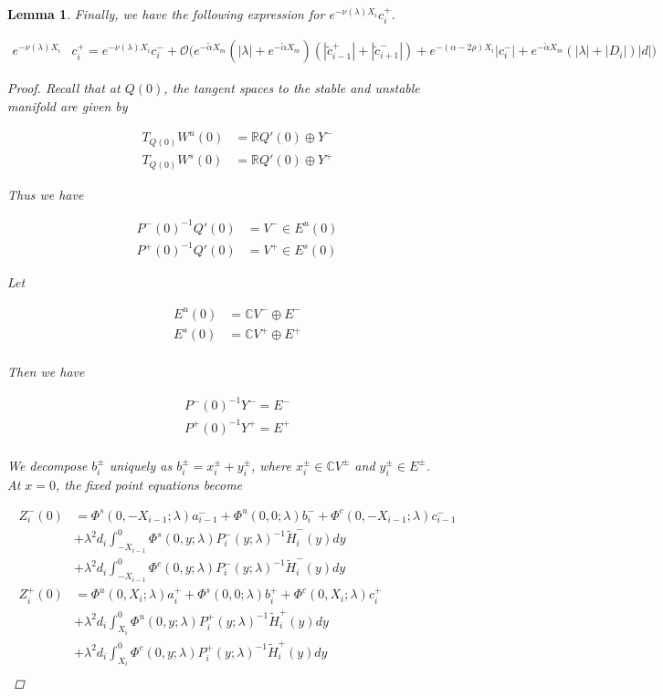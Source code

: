 \documentclass[12pt]{article}
\def\R{{\mathbb R}}
\def\C{{\mathbb C}}
\newtheorem{lemma}{Lemma}
\begin{document}
\begin{lemma}
Finally, we have the following expression for $e^{-\nu(\lambda)X_i} c_i^+$.

\begin{align}\label{tildecminus}
e^{-\nu(\lambda)X_i} &c_i^+ = e^{-\nu(\lambda)X_i} c_i^- 
+ \mathcal{O}\Big( e^{-\tilde{\alpha}X_m} (|\lambda| + e^{-\tilde{\alpha}X_m})( |\tilde{c}_{i-1}^+| + |\tilde{c}_{i+1}^-|) 
+ e^{-(\alpha - 2 \rho)X_i}|c_i^-| +  e^{-\tilde{\alpha}X_m}(|\lambda| + |D_i|)|d| \Big)
\end{align}

\begin{proof}

Recall that at $Q(0)$, the tangent spaces to the stable and unstable manifold are given by

\begin{align*}
T_{Q(0)} W^u(0) &= \R Q'(0) \oplus Y^- \\
T_{Q(0)} W^s(0) &= \R Q'(0) \oplus Y^+
\end{align*}

Thus we have

\begin{align*}
P^-(0)^{-1} Q'(0) &= V^- \in E^u(0) \\
P^+(0)^{-1} Q'(0) &= V^+ \in E^s(0)
\end{align*}

Let

\begin{align*}
E^u(0) &= \C V^- \oplus E^- \\
E^s(0) &= \C V^+ \oplus E^+ \\
\end{align*}

Then we have

\begin{align*}
P^-(0)^{-1} Y^- = E^- \\
P^+(0)^{-1} Y^+ = E^+ \\
\end{align*}

We decompose $b_i^\pm$ uniquely as $b_i^\pm = x_i^\pm + y_i^\pm$, where $x_i^\pm \in \C V^\pm$ and $y_i^\pm \in E^\pm$.\\

At $x = 0$, the fixed point equations become

\begin{align*}
Z_i^-(0) &= \Phi^s(0, -X_{i-1}; \lambda) a_{i-1}^- + \Phi^u(0, 0; \lambda) b_i^- + \Phi^c(0, -X_{i-1}; \lambda) c_{i-1}^- \\
&+ \lambda^2 d_i \int_{-X_{i-1}}^0 \Phi^s(0, y; \lambda) P_i^-(y; \lambda)^{-1} \tilde{H}_i^-(y) dy \\
&+ \lambda^2 d_i \int_{-X_{i-1}}^0 \Phi^c(0, y; \lambda) P_i^-(y; \lambda)^{-1} \tilde{H}_i^-(y) dy  \\ 
Z_i^+(0) &= \Phi^u(0, X_i; \lambda) a_i^+ + \Phi^s(0, 0; \lambda) b_i^+ + \Phi^c(0, X_i; \lambda) c_i^+ \\
&+ \lambda^2 d_i \int_{X_i}^0 \Phi^u(0, y; \lambda) P_i^+(y; \lambda)^{-1} \tilde{H}_i^+(y) dy \\
&+ \lambda^2 d_i \int_{X_i}^0 \Phi^c(0, y; \lambda) P_i^+(y; \lambda)^{-1} \tilde{H}_i^+(y) dy \\
\end{align*}


\end{proof}
\end{lemma}
\end{document}
